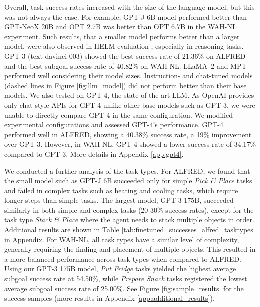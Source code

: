Overall, task success rates increased with the size of the language model, but this was not always the case. For example, GPT-J 6B model performed better than GPT-NeoX 20B and OPT 2.7B was better than OPT 6.7B in the WAH-NL experiment. Such results, that a smaller model performs better than a larger model, were also observed in HELM evaluation \citep{liang2022holistic}, especially in reasoning tasks. GPT-3 (text-davinci-003) showed the best success rate of 21.36\% on ALFRED and the best subgoal success rate of 40.82\% on WAH-NL. LLaMA~2 and MPT performed well considering their model sizes. Instruction- and chat-tuned models (dashed lines in Figure \ref{fig:llm_model}) did not perform better than their base models. 
We also tested on GPT-4, the state-of-the-art LLM. As OpenAI provides only chat-style APIs for GPT-4 unlike other base models such as GPT-3, we were unable to directly compare GPT-4 in the same configuration. We modified experimental configurations and assessed GPT-4's performance. GPT-4 performed well in ALFRED, showing a 40.38\% success rate, a 19\% improvement over GPT-3. However, in WAH-NL, GPT-4 showed a lower success rate of 34.17\% compared to GPT-3. More details in Appendix \ref{app:gpt4}.

We conducted a further analysis of the task types. For ALFRED, we found that the small model such as GPT-J 6B succeeded only for simple \textit{Pick \& Place} tasks and failed in complex tasks such as heating and cooling tasks, which require longer steps than simple tasks. The largest model, GPT-3 175B, succeeded similarly in both simple and complex tasks (20-30\% success rates), except for the task type \textit{Stack \& Place} where the agent needs to stack multiple objects in order. Additional results  are shown in Table \ref{tab:finetuned_successes_alfred_tasktypes} in Appendix.
For WAH-NL, all task types have a similar level of complexity, generally requiring the finding and placement of multiple objects. This resulted in a more balanced performance across task types when compared to ALFRED. Using our GPT-3 175B model, \textit{Put Fridge} tasks yielded the highest average subgoal success rate at 54.50\%, while \textit{Prepare Snack} tasks registered the lowest average subgoal success rate of 25.00\%. 
See Figure \ref{fig:sample_results} for the success samples (more results in Appendix \ref{app:additional_results}).

